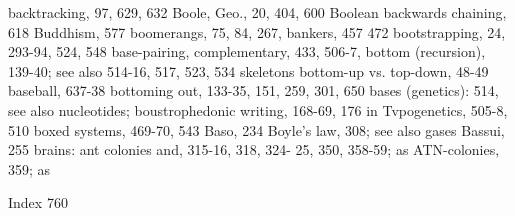backtracking, 97, 629, 632                     Boole, Geo., 20, 404, 600 Boolean
backwards chaining, 618                        Buddhism, 577 boomerangs, 75, 84, 267,
bankers, 457                                   472 bootstrapping, 24, 293-94, 524, 548
base-pairing, complementary, 433, 506-7,       bottom (recursion), 139-40; see also
514-16, 517, 523, 534                          skeletons bottom-up vs. top-down, 48-49
baseball, 637-38                               bottoming out, 133-35, 151, 259, 301, 650
bases (genetics): 514, see also nucleotides;   boustrophedonic writing, 168-69, 176
in Tvpogenetics, 505-8, 510                    boxed systems, 469-70, 543
Baso, 234                                      Boyle's law, 308; see also gases
Bassui, 255                                    brains: ant colonies and, 315-16, 318, 324-
                                               25, 350, 358-59; as ATN-colonies, 359; as



Index                                                                                  760

